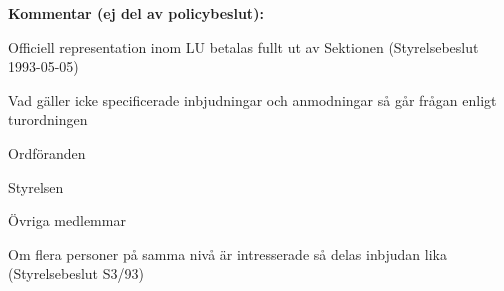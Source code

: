 \documentclass[../_main/handlingar.tex]{subfiles}
\begin{document}
\vspace{20px}
{\large \textbf{Kommentar (ej del av policybeslut):}}
\begin{dashlist}
    \item Officiell representation inom LU betalas fullt ut av Sektionen
    (Styrelsebeslut 1993-05-05)
    \item Vad gäller icke specificerade inbjudningar och anmodningar så går
    frågan enligt turordningen
    \begin{numplist}
    \item Ordföranden
    \item Styrelsen
    \item Övriga medlemmar
    \end{numplist}
    \item Om flera personer på samma nivå är intresserade så delas inbjudan lika
    (Styrelsebeslut S3/93)
\end{dashlist}

\newpage
\end{document}
